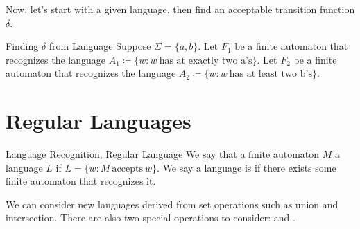 \documentclass[math]{amznotes}
\begin{document}
Now, let's start with a given language, then find an acceptable transition function $\delta$.
\begin{exbox}{Finding $\delta$ from Language}{}
    Suppose $\Sigma = \{a, b\}$. Let $F_1$ be a finite automaton that recognizes the language $A_1 \coloneq \{w : w\ \text{has at exactly two a's} \}$. Let $F_2$ be a finite automaton that recognizes the language $A_2 \coloneq \{w : w\ \text{has at least two b's} \}$.


\end{exbox}

\section{Regular Languages}

\begin{dfnbox}{Language Recognition, Regular Language}{}
    We say that a finite automaton $M$  a language $L$ if $L = \{ w : M\ \text{accepts}\ w \}$. We say a language is  if there exists some finite automaton that recognizes it.

\end{dfnbox}

We can consider new languages derived from set operations such as union and intersection. There are also two special operations to consider:  and .
\end{document}
